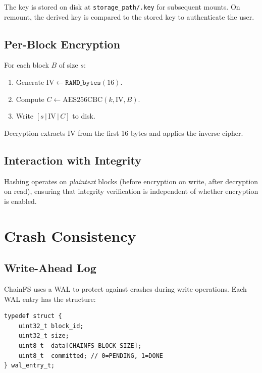 \documentclass[10pt,twocolumn]{article}
\begin{document}
The key is stored on disk at
\texttt{storage\_path/.key}
for subsequent mounts.
On remount, the derived key is compared
to the stored key to authenticate
the user.

\subsection{Per-Block Encryption}

For each block $B$ of size $s$:

\begin{enumerate}[leftmargin=*, label=\arabic*.]
    \item Generate $\text{IV} \leftarrow
    \texttt{RAND\_bytes}(16)$.
    \item Compute $C \leftarrow
    \text{AES256CBC}(k, \text{IV}, B)$.
    \item Write $[s \,|\, \text{IV} \,|\, C]$
    to disk.
\end{enumerate}

Decryption extracts IV from the first
16 bytes and applies the inverse cipher.

\subsection{Interaction with Integrity}

Hashing operates on \emph{plaintext} blocks
(before encryption on write,
after decryption on read),
ensuring that integrity verification
is independent of whether encryption
is enabled.

\section{Crash Consistency}

\subsection{Write-Ahead Log}

ChainFS uses a WAL to protect against
crashes during write operations.
Each WAL entry has the structure:

\begin{lstlisting}[caption={WAL entry}]
typedef struct {
    uint32_t block_id;
    uint32_t size;
    uint8_t  data[CHAINFS_BLOCK_SIZE];
    uint8_t  committed; // 0=PENDING, 1=DONE
} wal_entry_t;
\end{lstlisting}
\end{document}
